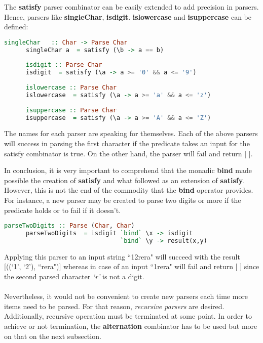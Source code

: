 \documentclass[a4paper, onecolumn]{article}
\begin{document}
    The \textbf{satisfy} parser combinator can be easily extended to add precision in parsers. Hence, parsers like \textbf{singleChar}, \textbf{isdigit}. \textbf{islowercase} and \textbf{isuppercase} can be defined:
    
    \begin{tcolorbox}
    \begin{lstlisting}[language=Haskell]
      singleChar   :: Char -> Parse Char
      singleChar a  = satisfy (\b -> a == b)
      
      isdigit :: Parse Char
      isdigit  = satisfy (\a -> a >= '0' && a <= '9')
      
      islowercase :: Parse Char
      islowercase  = satisfy (\a -> a >= 'a' && a <= 'z')
      
      isuppercase :: Parse Char 
      isuppercase  = satisfy (\a -> a >= 'A' && a <= 'Z')
    \end{lstlisting}
    \end{tcolorbox}
    
    The names for each parser are speaking for themselves. Each of the above parsers will success in parsing the first character if the predicate takes an input for the satisfy combinator is true. On the other hand, the parser will fail and return [ ]. 
    
    In conclusion, it is very important to comprehend that the monadic \textbf{bind} made possible the creation of \textbf{satisfy} and what followed as an extension of \textbf{satisfy}. However, this is not the end of the commodity that the \textbf{bind} operator provides. For instance, a new parser may be created to parse two digits or more if the predicate holds or to fail if it doesn't. 
    
    \begin{tcolorbox}
    \begin{lstlisting}[language=Haskell]
      parseTwoDigits :: Parse (Char, Char)
      parseTwoDigits  = isdigit `bind` \x -> isdigit 
                                `bind` \y -> result(x,y)
    \end{lstlisting}
    \end{tcolorbox}
    
    Applying this parser to an input string ``12rera" will succeed with the result [((`1', `2'), ``rera")] whereas in case of an input ``1rera" will fail and return [ ] since the second parsed character \textit{`r'} is not a digit. \\ \\
    Nevertheless, it would not be convenient to create new parsers each time more items need to be parsed. For that reason, \textit{recursive parsers} are desired. Additionally, recursive operation must be terminated at some point. In order to achieve or not termination, the \textbf{alternation} combinator has to be used but more on that on the next subsection.
\end{document}

